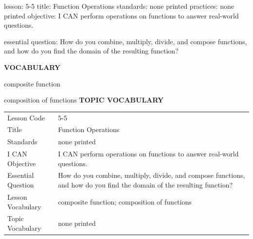 \documentclass{article}
\newenvironment{lesson-meta}{}{}        %
\newcommand{\te}[1]{}                   %
\begin{document}
\begin{lesson-meta}
lesson: 5-5
title: Function Operations
standards: none printed
practices: none printed
objective: I CAN perform operations on functions to answer real-world questions.

essential question: How do you combine, multiply, divide, and compose functions, and how do you find the domain of the resulting function?

\textbf{VOCABULARY}
\item composite function
\item composition of functions
\textbf{TOPIC VOCABULARY}
\te{No topic vocabulary list is printed on these lesson pages.}
\begin{tabular}{ll}
Lesson Code & 5-5 \\
Title & Function Operations \\
Standards & none printed \\
I CAN Objective & I CAN perform operations on functions to answer real-world questions. \\
Essential Question & How do you combine, multiply, divide, and compose functions, and how do you find the domain of the resulting function? \\
Lesson Vocabulary & composite function; composition of functions \\
Topic Vocabulary & none printed \\
\end{tabular}
\end{lesson-meta}
\end{document}
